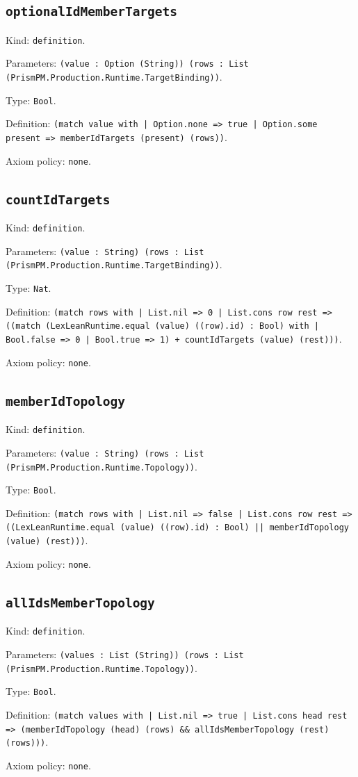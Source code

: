 \documentclass[11pt]{article}
\begin{document}
\subsection*{\texttt{optionalIdMemberTargets}}
\noindent Kind: \texttt{definition}.\par
\noindent Parameters: \texttt{(value : Option (String)) (rows : List (PrismPM.Production.Runtime.TargetBinding))}.\par
\noindent Type: \texttt{Bool}.\par
\noindent Definition: \texttt{(match value with | Option.none => true | Option.some present => memberIdTargets (present) (rows))}.\par
\noindent Axiom policy: \texttt{none}.\par
\subsection*{\texttt{countIdTargets}}
\noindent Kind: \texttt{definition}.\par
\noindent Parameters: \texttt{(value : String) (rows : List (PrismPM.Production.Runtime.TargetBinding))}.\par
\noindent Type: \texttt{Nat}.\par
\noindent Definition: \texttt{(match rows with | List.nil => 0 | List.cons row rest => ((match (LexLeanRuntime.equal (value) ((row).id) : Bool) with | Bool.false => 0 | Bool.true => 1) + countIdTargets (value) (rest)))}.\par
\noindent Axiom policy: \texttt{none}.\par
\subsection*{\texttt{memberIdTopology}}
\noindent Kind: \texttt{definition}.\par
\noindent Parameters: \texttt{(value : String) (rows : List (PrismPM.Production.Runtime.Topology))}.\par
\noindent Type: \texttt{Bool}.\par
\noindent Definition: \texttt{(match rows with | List.nil => false | List.cons row rest => ((LexLeanRuntime.equal (value) ((row).id) : Bool) || memberIdTopology (value) (rest)))}.\par
\noindent Axiom policy: \texttt{none}.\par
\subsection*{\texttt{allIdsMemberTopology}}
\noindent Kind: \texttt{definition}.\par
\noindent Parameters: \texttt{(values : List (String)) (rows : List (PrismPM.Production.Runtime.Topology))}.\par
\noindent Type: \texttt{Bool}.\par
\noindent Definition: \texttt{(match values with | List.nil => true | List.cons head rest => (memberIdTopology (head) (rows) \&\& allIdsMemberTopology (rest) (rows)))}.\par
\noindent Axiom policy: \texttt{none}.\par
\end{document}
